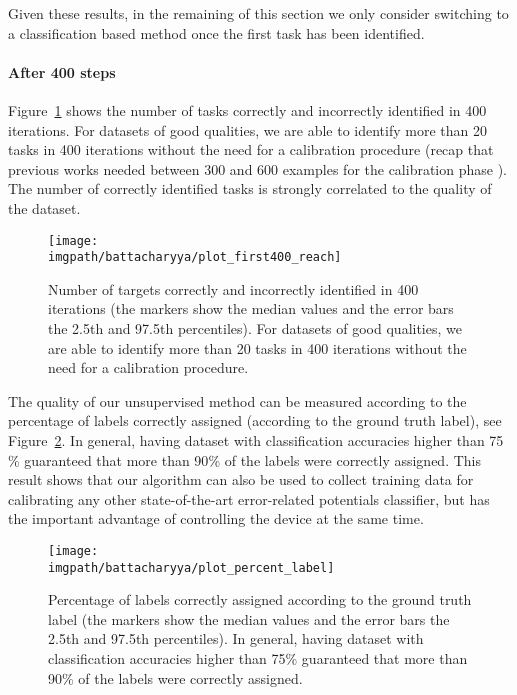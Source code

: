 Given these results, in the remaining of this section we only consider switching to a classification based method once the first task has been identified.

\paragraph{After 400 steps}

Figure~\ref{fig:overlapavg_sum_400} shows the number of tasks correctly and incorrectly identified in 400 iterations. For datasets of good qualities, we are able to identify more than 20 tasks in 400 iterations without the need for a calibration procedure (recap that previous works needed between 300 and 600 examples for the calibration phase \cite{chavarriaga2010learning,iturrate2010single}). The number of correctly identified tasks is strongly correlated to the quality of the dataset.

\begin{figure}[!ht]
    \centering
    \texttt{[image: \\imgpath/battacharyya/plot\_first400\_reach]} 
    \caption{Number of targets correctly and incorrectly identified in 400 iterations (the markers show the median values and the error bars the 2.5th and 97.5th percentiles). For datasets of good qualities, we are able to identify more than 20 tasks in 400 iterations without the need for a calibration procedure.}
    \label{fig:overlapavg_sum_400}
\end{figure} 

The quality of our unsupervised method can be measured according to the percentage of labels correctly assigned (according to the ground truth label), see Figure~\ref{fig:overlappercentageLabels}. In general, having dataset with classification accuracies higher than 75$\%$ guaranteed that more than 90$\%$ of the labels were correctly assigned. This result shows that our algorithm can also be used to collect training data for calibrating any other state-of-the-art error-related potentials classifier, but has the important advantage of controlling the device at the same time.

\begin{figure}[!ht]
    \centering
        \texttt{[image: \\imgpath/battacharyya/plot\_percent\_label]}
        \caption{Percentage of labels correctly assigned according to the ground truth label (the markers show the median values and the error bars the 2.5th and 97.5th percentiles). In general, having dataset with classification accuracies higher than 75$\%$ guaranteed that more than 90$\%$ of the labels were correctly assigned.}
        \label{fig:overlappercentageLabels}
\end{figure}

